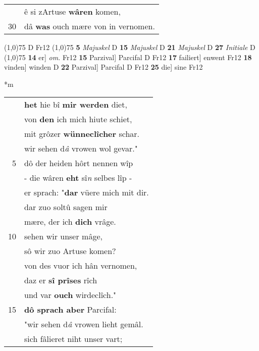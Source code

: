 \documentclass[8pt,a4paper,notitlepage]{article}
\begin{document}
\begin{table}[ht]
\begin{minipage}[t]{0.5\linewidth}
\begin{tabular}{rl}
 & ê si zArtuse \textbf{wâren} komen,\\ 
30 & dâ \textbf{was} ouch mære von in vernomen.\\ 
\end{tabular}
\scriptsize
\line(1,0){75} \newline
D Fr12 \newline
\line(1,0){75} \newline
\textbf{5} \textit{Majuskel} D  \textbf{15} \textit{Majuskel} D  \textbf{21} \textit{Majuskel} D  \textbf{27} \textit{Initiale} D  \newline
\line(1,0){75} \newline
\textbf{14} er] \textit{om.} Fr12 \textbf{15} Parzival] Parcifal D Fr12 \textbf{17} failiert] enwent Fr12 \textbf{18} vinden] winden D \textbf{22} Parzival] Parcifal D Fr12 \textbf{25} die] sine Fr12 \newline
\end{minipage}
\hspace{0.5cm}
\begin{minipage}[t]{0.5\linewidth}
\small
\begin{center}*m
\end{center}
\begin{tabular}{rl}
 & \textbf{het} hie bî \textbf{mir werden} diet,\\ 
 & von \textbf{den} ich mich hiute schiet,\\ 
 & mit grôzer \textbf{wünneclîcher} schar.\\ 
 & wir sehen d\textit{â} vrowen wol gevar."\\ 
5 & dô der heiden hôrt nennen wîp\\ 
 & - die wâren \textbf{eht} sî\textit{n} selbes lîp -\\ 
 & er sprach: "\textbf{dar} vüere mich mit dir.\\ 
 & dar zuo soltû sagen mir\\ 
 & mære, der ich \textbf{dich} vrâge.\\ 
10 & sehen wir unser mâge,\\ 
 & sô wir zuo Artuse komen?\\ 
 & von des vuor ich hân vernomen,\\ 
 & daz er \textbf{sî prîses} rîch\\ 
 & und var \textbf{ouch} wirdeclîch."\\ 
15 & \textbf{dô sprach aber} Parcifal:\\ 
 & "wir sehen d\textit{â} vrowen lieht gemâl.\\ 
 & sich fâlieret niht unser vart;\\ 

\end{tabular}
\end{minipage}
\end{table}
\end{document}

